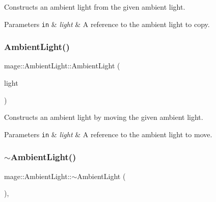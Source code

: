 Constructs an ambient light from the given ambient light.


\begin{DoxyParams}[1]{Parameters}
\mbox{\tt in}  & {\em light} & A reference to the ambient light to copy. \\
\hline
\end{DoxyParams}
\hypertarget{classmage_1_1_ambient_light_aab4919587032054d28ec15cf5639ad48}{}\label{classmage_1_1_ambient_light_aab4919587032054d28ec15cf5639ad48} 
\subsubsection{\texorpdfstring{Ambient\+Light()}{AmbientLight()}\hspace{0.1cm}{\footnotesize\ttfamily [3/3]}}
{\footnotesize\ttfamily mage\+::\+Ambient\+Light\+::\+Ambient\+Light (\begin{DoxyParamCaption}\item[{\hyperlink{classmage_1_1_ambient_light}{Ambient\+Light} \&\&}]{light }\end{DoxyParamCaption})\hspace{0.3cm}{\ttfamily [default]}}

Constructs an ambient light by moving the given ambient light.


\begin{DoxyParams}[1]{Parameters}
\mbox{\tt in}  & {\em light} & A reference to the ambient light to move. \\
\hline
\end{DoxyParams}
\hypertarget{classmage_1_1_ambient_light_a511bb794b11f112e750da09f4044e7db}{}\label{classmage_1_1_ambient_light_a511bb794b11f112e750da09f4044e7db} 
\subsubsection{\texorpdfstring{$\sim$\+Ambient\+Light()}{~AmbientLight()}}
{\footnotesize\ttfamily mage\+::\+Ambient\+Light\+::$\sim$\+Ambient\+Light (\begin{DoxyParamCaption}{ }\end{DoxyParamCaption})\hspace{0.3cm}{\ttfamily [virtual]}, {\ttfamily [default]}}

